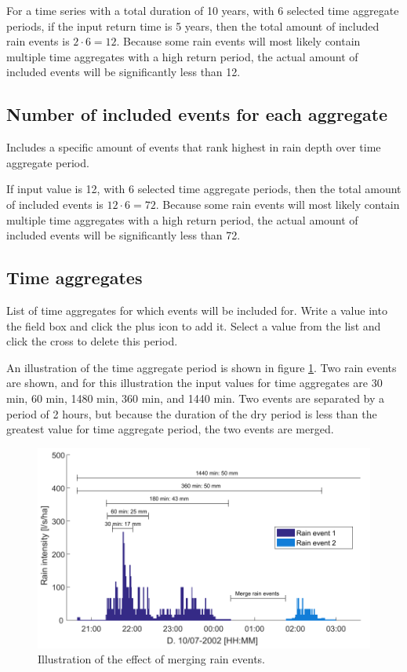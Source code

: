 \documentclass[a4paper,11pt]{refart}
\begin{document}
For a time series with a total duration of 10 years, with 6 selected time aggregate periods, if the input return time is 5 years, then the total amount of included rain events is $2\cdot 6 = 12$. Because some rain events will most likely contain multiple time aggregates with a high return period, the actual amount of included events will be significantly less than 12.
		\subsection{Number of included events for each aggregate}
		Includes a specific amount of events that rank highest in rain depth over time aggregate period. 
		
		If input value is 12, with 6 selected time aggregate periods, then the total amount of included events is $12\cdot 6 = 72$. Because some rain events will most likely contain multiple time aggregates with a high return period, the actual amount of included events will be significantly less than 72.
		
		\subsection{Time aggregates}
		List of time aggregates for which events will be included for. Write a value into the field box and click the plus icon to add it. Select a value from the list and click the cross to delete this period. 
		
		An illustration of the time aggregate period is shown in figure \ref{fig:RainEventPatterns}. Two rain events are shown, and for this illustration the input values for time aggregates are 30 min, 60 min, 1480 min, 360 min, and 1440 min. Two events are separated by a period of 2 hours, but because the duration of the dry period is less than the greatest value for time aggregate period, the two events are merged. 
		\begin{figure}[H]\centering
			\includegraphics[scale=0.7]{RainEventPatterns.pdf}
			\caption{Illustration of the effect of merging rain events.}\label{fig:RainEventPatterns}
		\end{figure}
	\newpage
	\newpage
	
\end{document}
